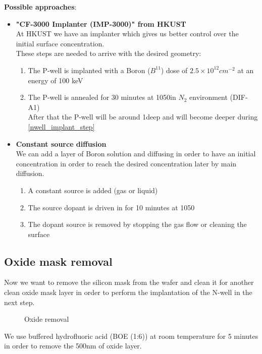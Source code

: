 \textbf{Possible approaches}:
\begin{itemize}
	\item \textbf{"CF-3000 Implanter (IMP-3000)" from HKUST} \\
	At HKUST we have an implanter which gives us better control over the initial surface concentration. \\
	These steps are needed to arrive with the desired geometry:
	\begin{enumerate}
		\item The P-well is implanted with a Boron ($B^{11}$) dose of $2.5\times10^{12}cm^{-2}$ at an energy of 100 keV
		\item The P-well is annealed for 30 minutes at 1050\degreesC in $N_2$ environment (DIF-A1)\\
		After that the P-well will be around 1\um deep and will become deeper during \autoref{nwell_implant_step}
	\end{enumerate}
	\item \textbf{Constant source diffusion} \\
	We can add a layer of Boron solution and diffusing in order to have an initial concentration in order to reach the desired concentration later by main diffusion.
	\begin{enumerate}
		\item A constant source is added (gas or liquid)
		\item The source dopant is driven in for 10 minutes at 1050\degreesC
		\item The dopant source is removed by stopping the gas flow or cleaning the surface
	\end{enumerate}
\end{itemize}

\subsection{Oxide mask removal}
Now we want to remove the silicon mask from the wafer and clean it for another clean oxide mask layer in order to perform the implantation of the N-well in the next step.

\begin{figure}[H]
	\centering
	\begin{tikzpicture}[node distance = 3cm, auto, thick,scale=\CrossSectionOnly, every node/.style={transform shape}]
		
	\end{tikzpicture}
	\drawStepArrow{}
	\begin{tikzpicture}[node distance = 3cm, auto, thick,scale=\CrossSectionOnly, every node/.style={transform shape}]
		
	\end{tikzpicture}
	\caption{Oxide removal}
\end{figure}

We use buffered hydrofluoric acid (BOE (1:6)) at room temperature for 5 minutes in order to remove the 500nm of oxide layer.